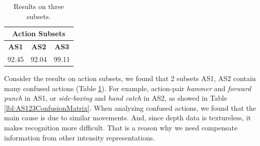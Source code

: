 \documentclass[review]{elsarticle}
\begin{document}
\begin{table}[H]
	\begin{center}
		\begin{tabular}{ccc}
		
		       \multicolumn{ 3}{c}{{\bf Action Subsets}} \\
		\hline
		     {\bf AS1} &      {\bf AS2} &      {\bf AS3} \\
		\hline
		        92.45  &         92.04  &         99.11  \\
		
		\end{tabular}
	\end{center}
	\caption{\label{lbl:MBHandAS123}Results on three subsets.}
\end{table}

Consider the results on action subsets, we found that 2 subsets AS1, AS2 contain many confused actions (Table \ref{lbl:MBHandAS123}). For example, action-pair \textit{hammer} and \textit{forward punch} in AS1, or \textit{side-boxing} and \textit{hand catch} in AS2, as showed in Table \ref{lbl:AS123ConfusionMatrix}. When analyzing confused actions, we found that the main cause is due to similar movements. And, since depth data is textureless, it makes recognition more difficult. That is a reason why we need compensate information from other intensity representations.
\end{document}
